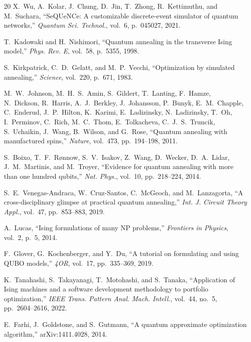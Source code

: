 \documentclass[10pt,a4paper]{article}
\begin{document}
\begin{thebibliography}{20}
X.~Wu, A.~Kolar, J.~Chung, D.~Jin, T.~Zhong, R.~Kettimuthu, and
M.~Suchara, ``SeQUeNCe: A customizable discrete-event simulator of
quantum networks,''
\emph{Quantum Sci. Technol.}, vol.~6, p.~045027, 2021.

T.~Kadowaki and H.~Nishimori,
``Quantum annealing in the transverse Ising model,''
\emph{Phys. Rev. E}, vol.~58, p.~5355, 1998.

S.~Kirkpatrick, C.~D.~Gelatt, and M.~P.~Vecchi,
``Optimization by simulated annealing,''
\emph{Science}, vol.~220, p.~671, 1983.

M.~W.~Johnson, M.~H.~S.~Amin, S.~Gildert, T.~Lanting, F.~Hamze,
N.~Dickson, R.~Harris, A.~J.~Berkley, J.~Johansson, P.~Bunyk,
E.~M.~Chapple, C.~Enderud, J.~P.~Hilton, K.~Karimi, E.~Ladizinsky,
N.~Ladizinsky, T.~Oh, I.~Perminov, C.~Rich, M.~C.~Thom, E.~Tolkacheva,
C.~J.~S.~Truncik, S.~Uchaikin, J.~Wang, B.~Wilson, and G.~Rose,
``Quantum annealing with manufactured spins,''
\emph{Nature}, vol.~473, pp.~194--198, 2011.

S.~Boixo, T.~F.~R{\o}nnow, S.~V.~Isakov, Z.~Wang, D.~Wecker,
D.~A.~Lidar, J.~M.~Martinis, and M.~Troyer,
``Evidence for quantum annealing with more than one hundred qubits,''
\emph{Nat. Phys.}, vol.~10, pp.~218--224, 2014.

S.~E.~Venegas-Andraca, W.~Cruz-Santos, C.~McGeoch, and
M.~Lanzagorta, ``A cross-disciplinary glimpse at practical quantum
annealing,''
\emph{Int. J. Circuit Theory Appl.}, vol.~47, pp.~853--883, 2019.

A.~Lucas, ``Ising formulations of many NP problems,''
\emph{Frontiers in Physics}, vol.~2, p.~5, 2014.

F.~Glover, G.~Kochenberger, and Y.~Du,
``A tutorial on formulating and using QUBO models,''
\emph{4OR}, vol.~17, pp.~335--369, 2019.

K.~Tanahashi, S.~Takayanagi, T.~Motohashi, and S.~Tanaka,
``Application of Ising machines and a software development methodology
to portfolio optimization,''
\emph{IEEE Trans. Pattern Anal. Mach. Intell.}, vol.~44, no.~5,
pp.~2604--2616, 2022.

E.~Farhi, J.~Goldstone, and S.~Gutmann,
``A quantum approximate optimization algorithm,''
arXiv:1411.4028, 2014.


\end{thebibliography}
\end{document}
